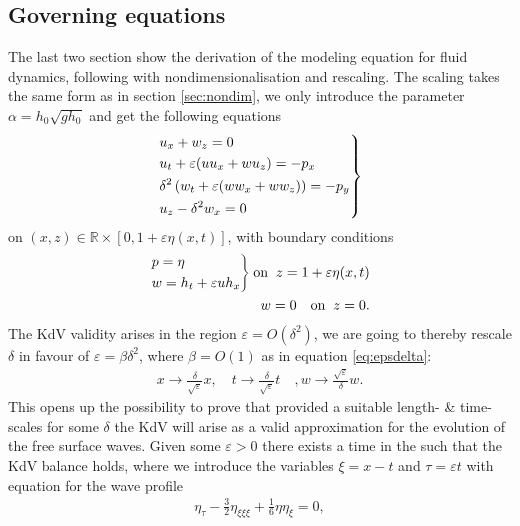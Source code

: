 \subsection{Governing equations}
The last two section show the derivation of the modeling equation for fluid
dynamics, following with nondimensionalisation and rescaling. The scaling
takes the same form as in section \ref{sec:nondim}, we only introduce the
parameter $\alpha = h_0\sqrt{gh_0} $ and get the following equations
\begin{align}
    \begin{drcases}
    u_x + w_z = 0\\
    u_t + \varepsilon(uu_x + wu_z) = -p_x\\
    \delta^2\left(w_t + \varepsilon(w w_x + w w_z)\right) = -p_y\\
    u_z - \delta^2 w_x = 0
    \end{drcases}
\end{align}
on $(x, z) \in \mathbb{R}\times [0, 1+\varepsilon \eta(x, t)]$, with boundary
conditions
\begin{align}
    \begin{drcases}
        p = \eta \\
        w = h_t + \varepsilon u h_x
    \end{drcases}
    \text{on}\;\; z = 1+\varepsilon \eta(x, t)\\
    w = 0 \quad \text{on}\;\; z = 0.
\end{align}
The KdV validity arises in the region $\varepsilon = O(\delta^2)$, we are
going to thereby rescale $\delta$ in favour of $\varepsilon = \beta
\delta^2$, where $\beta = O(1)$ as in equation \ref{eq:epsdelta}:
\begin{align}\label{eq:epsdelta}
    x \rightarrow \frac{\delta}{\sqrt{\varepsilon} }x, \quad t
    \rightarrow \frac{\delta}{\sqrt{\varepsilon} }t\quad,
    w \rightarrow \frac{\sqrt{\varepsilon} }{\delta}w.
\end{align}
This opens up the possibility to prove that provided a suitable length- \&
time-scales for some $\delta$ the KdV will arise as a valid approximation for
the evolution of the free surface waves. Given some $\varepsilon>0$ there
exists a time in the such that the KdV balance holds, where we introduce the
variables $\xi = x- t$ and $\tau = \varepsilon t$ with equation for the wave profile
\begin{align}
    \eta_\tau - \frac{3}{2} \eta_{\xi\xi\xi} + \frac{1}{6} \eta \eta_\xi = 0,
\end{align}
